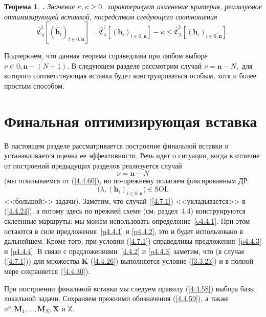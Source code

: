\documentclass[11pt,twoside,openany]{report}
\newcommand{\bfn}{\begin{equation}}
\newcommand{\efn}{\end{equation}}
\newcommand{\ov}{\overline}
\newcounter{theo}
\newtheorem{theo}{Теорема}[section]
\newcommand{\TL}{\mbox{\bf{$\!\!$.}}}
\newcommand{\la}{\lambda}
\newcommand{\nn}{{\mathbf n}}
\begin{document}
{{\begin{theo}\label{t4.6.1}{\TL} Значение $\kappa, \kappa \geqslant 0,$ характеризует изменение
критерия, реализуемое оптимизирующей вставкой, посредством следующего соотношения
$$
\widehat{\mathfrak{C}}_\eta^\natural[(\hat{\mathbf{h}}_t)_{t\in\ov{0,\nn}}] =
\widehat{\mathfrak{C}}_\la^\natural[(\mathbf{h}_i)_{i\in\ov{0,\nn}}]  - \kappa \leqslant
\widehat{\mathfrak{C}}_\la^\natural[(\mathbf{h}_i)_{i\in\ov{0,\nn}}].
$$
\end{theo}

Подчеркнем, что данная теорема справедлива при любом выборе $\nu\in \ov{0,\nn-(N+1)}.$
В следующем разделе рассмотрим случай $\nu= \nn-N,$ для которого соответствующая вставка
будет конструироваться особым, хотя и более простым способом.

\section{Финальная оптимизирующая вставка}
\setcounter{equation}{0}

В настоящем разделе рассматривается построение финальной вставки и устанавливается
оценка ее эффективности. Речь идет о ситуации, когда в отличие от построений предыдущих
разделов реализуется случай
\bfn\label{4.7.1}\nu =\nn - N
\efn
(мы отказываемся от (\ref{4.4.60}), но по-прежнему полагаем фиксированным ДР
$$\bigl(\la,(\mathbf{h}_i)_{i\in\ov{0,\nn}}\bigl)\in \mathrm{SOL}
$$
<<большой>> задачи). Заметим, что случай (\ref{4.7.1}) <<укладывается>> в (\ref{4.4.24}),
а потому здесь по прежней схеме (см. раздел~4.4) конструируются склеенные маршруты: мы
можем использовать определение~\ref{o4.4.1}. При этом остаются в силе
предложения~\ref{p4.4.1} и \ref{p4.4.2}, это и будет использовано в дальнейшем. Кроме
того, при условии (\ref{4.7.1}) справедливы предложения~\ref{p4.4.3} и \ref{p4.4.4}.
В связи с предложениями~\ref{4.4.2} и \ref{p4.4.3} заметим, что (в случае (\ref{4.7.1}))
для множества $\mathbf{K}$ (\ref{4.4.26}) выполняется условие (\ref{3.3.23}) и в полной
мере сохраняется (\ref{4.4.30}).

При построении финальной вставки мы следуем правилу (\ref{4.4.58}) выбора базы локальной
задачи. Сохраняем прежними обозначения (\ref{4.4.59}), а также $x^o,\mathbf{M}_1,\ldots,
\mathbf{M}_N,\mathbf{X}$ и $\mathbb{X}.$

}}
\end{document}

